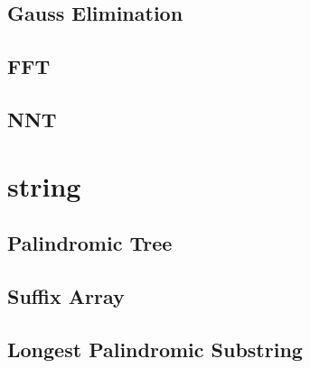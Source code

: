 \documentclass[10pt,twocolumn,oneside]{article}
\begin{document}
\subsection{Gauss Elimination}

\subsection{FFT}

\subsection{NNT}


\section{string}
\subsection{Palindromic Tree}

\subsection{Suffix Array}

\subsection{Longest Palindromic Substring}

\end{document}
